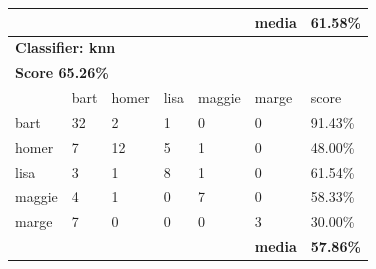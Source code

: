 \documentclass[journal]{IEEEtran}
\begin{document}
\begin{table}[!htb]
\begin{tabular}{l|l|l|l|l|l|l}
          &           &           &           &           & \textbf{media} & \textbf{61.58\%} \\ \hline
\multicolumn{7}{l}{\textbf{Classifier: knn}}                                                \\ \hline
\multicolumn{7}{l}{\textbf{Score 65.26\%}}                                                  \\ \hline
          & bart      & homer     & lisa      & maggie    & marge          & score            \\ \hline
bart      & 32        & 2         & 1         & 0         & 0              & 91.43\%          \\ \hline
homer     & 7         & 12        & 5         & 1         & 0              & 48.00\%          \\ \hline
lisa      & 3         & 1         & 8         & 1         & 0              & 61.54\%          \\ \hline
maggie    & 4         & 1         & 0         & 7         & 0              & 58.33\%          \\ \hline
marge     & 7         & 0         & 0         & 0         & 3              & 30.00\%          \\ \hline
          &           &           &           & \textbf{} & \textbf{media} & \textbf{57.86\%} \\ \hline
\end{tabular}
\end{table}
\end{document}
